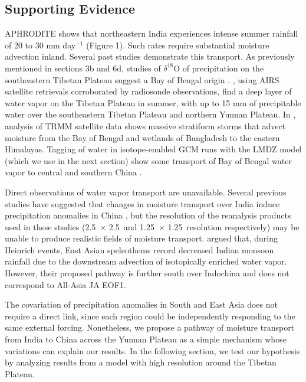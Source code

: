 \subsection{Supporting Evidence}

	APHRODITE shows that northeastern India experiences intense summer rainfall of 20 to 30 mm day$^{-1}$ (Figure 1). Such rates require substantial moisture advection inland. Several past studies demonstrate this transport. As previously mentioned in sections 3b and 6d, studies of $\delta^{18}$O of precipitation on the southeastern Tibetan Plateau suggest a Bay of Bengal origin \citep{Yao2009,Gao2011,Yang2011}. \cite{Zhang2013}, using AIRS satellite retrievals corroborated by radiosonde observations, find a deep layer of water vapor on the Tibetan Plateau in summer, with up to 15 mm of precipitable water over the southeastern Tibetan Plateau and northern Yunnan Plateau. In \cite{Medina2010}, analysis of TRMM satellite data shows massive stratiform storms that advect moisture from the Bay of Bengal and wetlands of Bangladesh to the eastern Himalayas. Tagging of water in isotope-enabled GCM runs with the LMDZ model (which we use in the next section) show some transport of Bay of Bengal water vapor to central and southern China \citep{Yao2013}.
	
	Direct observations of water vapor transport are unavailable. Several previous studies have suggested that changes in moisture transport over India induce precipitation anomalies in China \citep{Feng2012,Cao2014}, but the resolution of the reanalysis products used in these studies (2.5\textdegree\ $\times$ 2.5\textdegree\ and 1.25\textdegree\ $\times$ 1.25\textdegree\ resolution respectively) may be unable to produce realistic fields of moisture transport. \cite{Pausata2011} argued that, during Heinrich events, East Asian speleothems record decreased Indian monsoon rainfall due to the downstream advection of isotopically enriched water vapor. However, their proposed pathway is further south over Indochina and does not correspond to All-Asia JA EOF1.	
		
	The covariation of precipitation anomalies in South and East Asia does not require a direct link, since each region could be independently responding to the same external forcing. Nonetheless, we propose a pathway of moisture transport from India to China across the Yunnan Plateau as a simple mechanism whose variations can explain our results.  In the following section, we test our hypothesis by analyzing results from a model with high resolution around the Tibetan Plateau.

